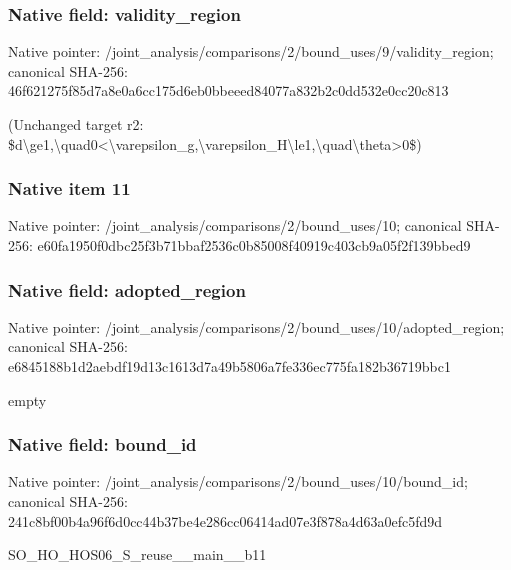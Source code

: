 \documentclass[10pt,a4paper]{article}
\begin{document}
\subsubsection{Native field: validity\_\allowbreak{}region}
Native pointer: /joint\_\allowbreak{}analysis/comparisons/2/bound\_\allowbreak{}uses/9/validity\_\allowbreak{}region; canonical SHA-256: 46f621275f85d7a8e0a6cc175d6eb0bbeeed84077a832b2c0dd532e0cc20c813

\begingroup\raggedright\sloppy (Unchanged target r2:\allowbreak{} \$d\textbackslash{}ge1,\allowbreak{}\textbackslash{}quad0<\textbackslash{}varepsilon\_\allowbreak{}g,\allowbreak{}\textbackslash{}varepsilon\_\allowbreak{}H\textbackslash{}le1,\allowbreak{}\textbackslash{}quad\textbackslash{}theta>0\$)\par\endgroup

\subsubsection{Native item 11}
Native pointer: /joint\_\allowbreak{}analysis/comparisons/2/bound\_\allowbreak{}uses/10; canonical SHA-256: e60fa1950f0dbc25f3b71bbaf2536c0b85008f40919c403cb9a05f2f139bbed9

\subsubsection{Native field: adopted\_\allowbreak{}region}
Native pointer: /joint\_\allowbreak{}analysis/comparisons/2/bound\_\allowbreak{}uses/10/adopted\_\allowbreak{}region; canonical SHA-256: e6845188b1d2aebdf19d13c1613d7a49b5806a7fe336ec775fa182b36719bbc1

\begingroup\raggedright\sloppy empty\par\endgroup

\subsubsection{Native field: bound\_\allowbreak{}id}
Native pointer: /joint\_\allowbreak{}analysis/comparisons/2/bound\_\allowbreak{}uses/10/bound\_\allowbreak{}id; canonical SHA-256: 241c8bf00b4a96f6d0cc44b37be4e286cc06414ad07e3f878a4d63a0efc5fd9d

\begingroup\raggedright\sloppy SO\_\allowbreak{}HO\_\allowbreak{}HOS06\_\allowbreak{}S\_\allowbreak{}reuse\_\allowbreak{}\_\allowbreak{}main\_\allowbreak{}\_\allowbreak{}b11\par\endgroup
\end{document}
